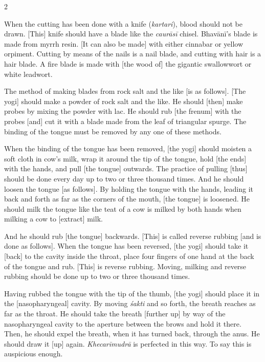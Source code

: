 \begin{nohyp}
\begin{multicols}{2}
\begin{eng}
When the cutting has been done with a knife (\textit{kartari}), blood should not be drawn. [This] knife should have a blade like the \textit{caurāsī} chisel. Bhavānī’s blade is made from myrrh resin. [It can also be made] with either cinnabar or yellow orpiment. Cutting by means of the nails is a nail blade, and cutting with hair is a hair blade. A fire blade is made with [the wood of] the gigantic swallowwort or white leadwort.
 
The method of making blades from rock salt and the like [is as follows]. [The yogi] should make a powder of rock salt and the like. He should [then] make probes by mixing the powder with lac. He should rub [the frenum] with the probes [and] cut it with a blade made from the leaf of triangular spurge. The binding of the tongue must be removed by any one of these methods.
\vskip 7pt


When the binding of the tongue has been removed, [the yogi] should moisten a soft cloth in cow’s milk, wrap it around the tip of the tongue, hold [the ends] with the hands, and pull [the tongue] outwards. The practice of pulling [thus] should be done every day up to two or three thousand times. And he should loosen the tongue [as follows]. By holding the tongue with the hands, leading it back and forth as far as the corners of the mouth, [the tongue] is loosened. He should milk the tongue like the teat of a cow is milked by both hands when milking a cow to [extract] milk.

And he should rub [the tongue] backwards. [This] is called reverse rubbing [and is done as follows]. When the tongue has been reversed, [the yogi] should take it [back] to the cavity inside the throat, place four fingers of one hand at the back of the tongue and rub. [This] is reverse rubbing.  Moving, milking and reverse rubbing should be done up to two or three thousand times.


Having rubbed the tongue with the tip of the thumb, [the yogi] should place it in the [nasopharyngeal] cavity. By moving \textit{śakti} and so forth, the breath reaches as far as the throat. He should take the breath [further up] by way of the nasopharyngeal cavity to the aperture between the brows and hold it there. Then, he should expel the breath, when it has turned back, through the anus. He should draw it [up] again. \textit{Khecarīmudrā} is perfected in this way.  To say this is auspicious enough.
\end{eng}
\end{multicols}
\end{nohyp}

